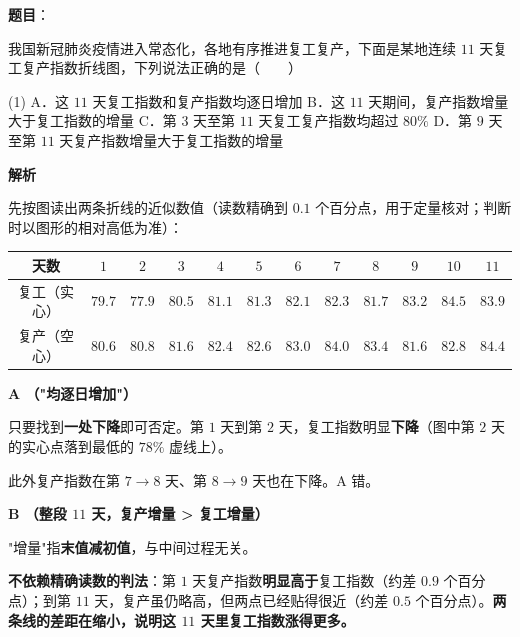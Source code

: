 \begin{answer}

\textbf{题目}：

我国新冠肺炎疫情进入常态化，各地有序推进复工复产，下面是某地连续 $11$ 天复工复产指数折线图，下列说法正确的是\mbox{（　　）}
\nopagebreak[4]
\begin{center}\end{center}
\nopagebreak[4]
\begin{gkopts}(1)
\task A．这 $11$ 天复工指数和复产指数均逐日增加
\task B．这 $11$ 天期间，复产指数增量大于复工指数的增量
\task C．第 $3$ 天至第 $11$ 天复工复产指数均超过 $80\%$
\task D．第 $9$ 天至第 $11$ 天复产指数增量大于复工指数的增量
\end{gkopts}

\textbf{解析}

先按图读出两条折线的近似数值（读数精确到 $0.1$ 个百分点，用于定量核对；判断时以图形的相对高低为准）：

\begin{center}
\begingroup\setlength{\tabcolsep}{4pt}
\begin{tabular}{cccccccccccc}
\toprule
天数 & $1$ & $2$ & $3$ & $4$ & $5$ & $6$ & $7$ & $8$ & $9$ & $10$ & $11$ \\
\midrule
复工（实心） & $79.7$ & $77.9$ & $80.5$ & $81.1$ & $81.3$ & $82.1$ & $82.3$ & $81.7$ & $83.2$ & $84.5$ & $83.9$ \\
复产（空心） & $80.6$ & $80.8$ & $81.6$ & $82.4$ & $82.6$ & $83.0$ & $84.0$ & $83.4$ & $81.6$ & $82.8$ & $84.4$ \\
\bottomrule
\end{tabular}
\endgroup
\end{center}

\par\medskip

\textbf{A （"均逐日增加"）}

只要找到\textbf{一处下降}即可否定。第 $1$ 天到第 $2$ 天，复工指数明显\textbf{下降}（图中第 $2$ 天的实心点落到最低的 $78\%$ 虚线上）。

此外复产指数在第 $7\to8$ 天、第 $8\to9$ 天也在下降。A 错。

\par\medskip

\textbf{B （整段 $11$ 天，复产增量 > 复工增量）}

"增量"指\textbf{末值减初值}，与中间过程无关。

\textbf{不依赖精确读数的判法}：第 $1$ 天复产指数\textbf{明显高于}复工指数（约差 $0.9$ 个百分点）；到第 $11$ 天，复产虽仍略高，但两点已经贴得很近（约差 $0.5$ 个百分点）。\textbf{两条线的差距在缩小，说明这 $11$ 天里复工指数涨得更多。}


\end{answer}
